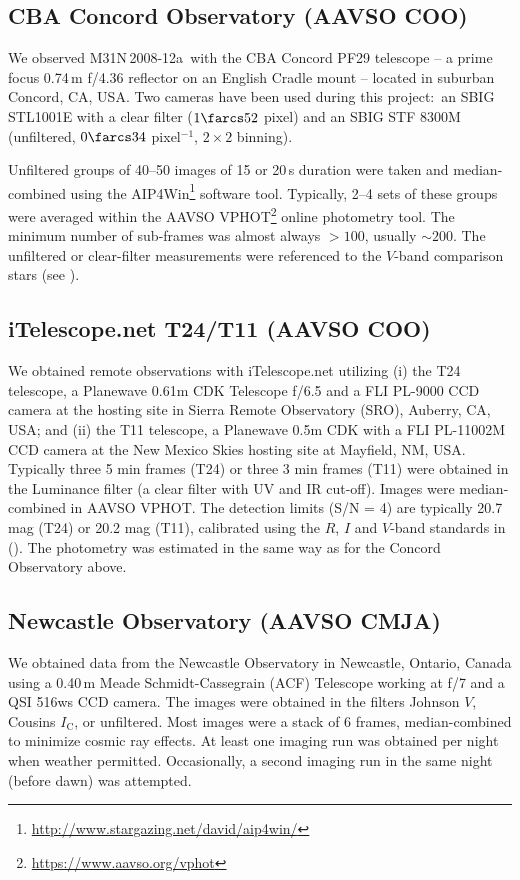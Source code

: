 \documentclass[twocolumn,tighten]{aastex6}
\def\nova{{M31N\,2008-12a~}}
\newcommand{\othreek}{\citetalias{2016ApJ...833..149D}}
\begin{document}
\subsection{CBA Concord Observatory (AAVSO COO)}

We observed \nova with the CBA Concord PF29 telescope -- a prime focus 0.74\,m f/4.36 reflector on an English Cradle mount -- located in suburban Concord, CA, USA. Two cameras have been used during this project:\ an SBIG STL1001E with a clear filter ($1\farcs52$ pixel) and an SBIG STF 8300M (unfiltered, $0\farcs34$ pixel$^{-1}$, $2\times2$ binning).

Unfiltered groups of 40--50 images of 15 or 20\,s duration were taken and median-combined using the AIP4Win\footnote{\url{http://www.stargazing.net/david/aip4win/}} software tool. Typically, 2--4 sets of these groups were averaged within the AAVSO VPHOT\footnote{\url{https://www.aavso.org/vphot}} online photometry tool. The minimum number of sub-frames was almost always $>100$, usually $\sim200$. The unfiltered or clear-filter measurements were referenced to the $V$-band comparison stars (see \othreek).

\subsection{iTelescope.net T24/T11 (AAVSO COO)}

We obtained remote observations with iTelescope.net utilizing (i) the T24 telescope, a Planewave 0.61m CDK Telescope f/6.5 and a FLI PL-9000 CCD camera at the hosting site in Sierra Remote Observatory (SRO), Auberry, CA, USA; and (ii) the T11 telescope, a Planewave 0.5m CDK with a FLI PL-11002M CCD camera at the New Mexico Skies hosting site at Mayfield, NM, USA. Typically three 5 min frames (T24) or three 3 min frames (T11) were obtained in the Luminance filter (a clear filter with UV and IR cut-off). Images were median-combined in AAVSO VPHOT. The detection limits (S/N = 4) are typically 20.7 mag (T24) or 20.2 mag (T11), calibrated using the $R$, $I$ and $V$-band standards in (\othreek). The photometry was estimated in the same way as for the Concord Observatory above.

\subsection{Newcastle Observatory (AAVSO CMJA)}

We obtained data from the Newcastle Observatory in Newcastle, Ontario, Canada using a 0.40\,m Meade Schmidt-Cassegrain (ACF) Telescope working at f/7 and a QSI 516ws CCD camera. The images were obtained in the filters Johnson $V$, Cousins $I_\mathrm{C}$, or unfiltered. Most images were a stack of 6 frames, median-combined to minimize cosmic ray effects. At least one imaging run was obtained per night when weather permitted. Occasionally, a second imaging run in the same night (before dawn) was attempted.
\end{document}
